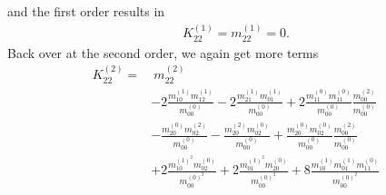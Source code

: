 and the first order results in
\begin{equation}
  \begin{aligned}
    K_{22}^{(1)} = m_{22}^{(1)} =  0.
  \end{aligned}
\end{equation}
Back over at the second order, we again get more terms
\begin{equation}
  \begin{aligned}
    K_{22}^{(2)}
    = &\
    m_{22}^{(2)}
    \\&
    - 2 \frac{ m_{10}^{(1)} m_{12}^{(1)} }{m_{00}^{(0)}}
    - 2 \frac{ m_{21}^{(1)} m_{01}^{(1)} }{m_{00}^{(0)}}
    + 2 \frac{ m_{11}^{(0)} m_{11}^{(0)} }{m_{00}^{(0)}}\frac{ m_{00}^{(2)} }{m_{00}^{(0)}}
    \\&
    - \frac{ m_{20}^{(0)} m_{02}^{(2)} }{m_{00}^{(0)}}
    - \frac{ m_{20}^{(2)} m_{02}^{(0)} }{m_{00}^{(0)}}
    + \frac{ m_{20}^{(0)} m_{02}^{(0)} }{m_{00}^{(0)}}\frac{ m_{00}^{(2)} }{m_{00}^{(0)}}
    \\&
    + 2 \frac{ m_{10}^{{(1)}^2} m_{02}^{(0)} }{m_{00}^{{(0)}^2}}
    + 2 \frac{ m_{01}^{{(1)}^2} m_{20}^{(0)} }{m_{00}^{{(0)}^2}}
    + 8 \frac{ m_{10}^{(1)}m_{01}^{(1)} m_{11}^{(0)} }{m_{00}^{{(0)}^2}}
  \end{aligned}
\end{equation}

